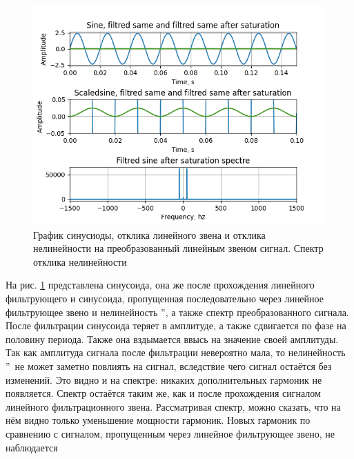 \begin{figure}[H]
	\centering
	\includegraphics[width=1.05\linewidth]{body/images/filtred-sine-after-saturation-and-its-spectre.png}
	\caption{График синусиоды, отклика линейного звена и отклика нелинейности на преобразованный
	линейным звеном сигнал. Спектр отклика нелинейности}
	\label{fig:37}
\end{figure}

На рис. \ref{fig:37} представлена синусоида, она же после прохождения
линейного фильтрующего и синусоида, пропущенная последовательно через линейное
фильтрующее звено и нелинейность \textquotedblright,
а также спектр преобразованного сигнала. После фильтрации синусоида теряет в амплитуде,
а также сдвигается по фазе на половину периода. Также она вздымается ввысь на значение
своей амплитуды. Так как амплитуда сигнала после фильтрации невероятно мала, то
нелинейность \textquotedblright\ не может заметно повлиять
на сигнал, вследствие чего сигнал остаётся без изменений. Это видно и на спектре:
никаких дополнительных гармоник не появляется. Спектр остаётся таким же, как и после
прохождения сигналом линейного фильтрационного звена. Рассматривая спектр, можно
сказать, что на нём видно только уменьшение мощности гармоник. Новых гармоник по
сравнению с сигналом, пропущенным через линейное фильтрующее звено, не наблюдается

